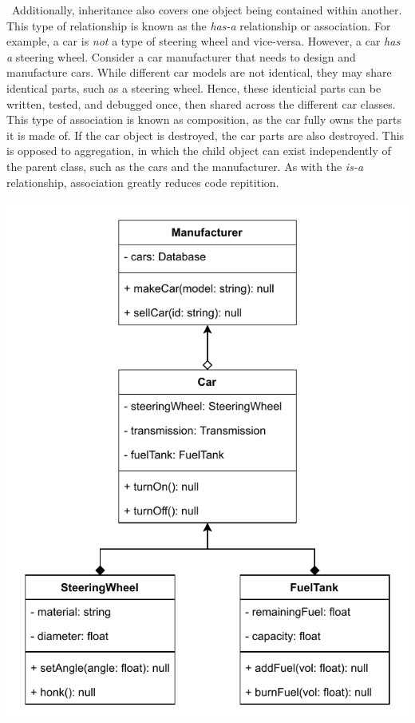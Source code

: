 \documentclass[11pt]{article}
\begin{document}
\noindent
\begin{minipage}[t]{0.5\textwidth}
    \vspace{0pt}
    \, Additionally, inheritance also covers one object being contained within another. This type of relationship is known as the \textit{has-a} relationship or association. For example, a car is \textit{not} a type of steering wheel and vice-versa. However, a car \textit{has a} steering wheel. Consider a car manufacturer that needs to design and manufacture cars. While different car models are not identical, they may share identical parts, such as a steering wheel. Hence, these identicial parts can be written, tested, and debugged once, then shared across the different car classes. This type of association is known as composition, as the car fully owns the parts it is made of. If the car object is destroyed, the car parts are also destroyed. This is opposed to aggregation, in which the child object can exist independently of the parent class, such as the cars and the manufacturer. As with the \textit{is-a} relationship, association greatly reduces code repitition.
\end{minipage}
\begin{minipage}[t]{0.5\textwidth}
    \vspace{0pt}
    \includegraphics[width=\textwidth]{figures/association.pdf}
    \label{fig:association-uml}
\end{minipage}
\end{document}
